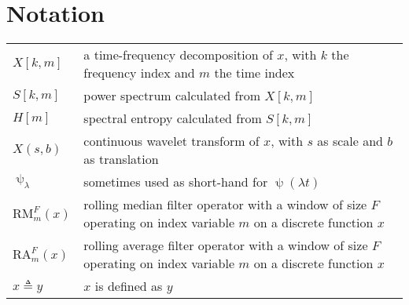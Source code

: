 \section*{Notation}
\begin{tabular}{p{} p{}}
    $X[k,m]$ & a time-frequency decomposition of $x$, with $k$ the frequency index and $m$ the time index \\
    $S[k,m]$ & power spectrum calculated from $X[k, m]$ \\
    $H[m]$ & spectral entropy calculated from $S[k, m]$ \\
    $X(s, b)$ & continuous wavelet transform of $x$, with $s$ as scale and $b$ as translation \\
    $\uppsi_\lambda$ & sometimes used as short-hand for  $\uppsi(\lambda t)$\\
    $\text{RM}^F_m (x)$ & rolling median filter operator with a window of size $F$ operating on index variable $m$ on a discrete function $x$\\
    $\text{RA}^F_m (x)$ & rolling average filter operator with a window of size $F$ operating on index variable $m$ on a discrete function $x$\\
    $x \triangleq y$ & $x$ is defined as $y$\\
\end{tabular}


